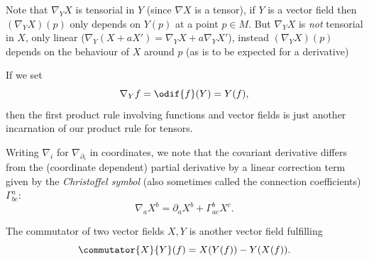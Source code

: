 \documentclass[titlepage,numbers=noenddot,headinclude,oneside,%
footinclude=true,cleardoublepage=empty,%
BCOR=5mm,paper=a4,fontsize=11pt,%
english,%
]{scrartcl}
\begin{document}
\begin{remark}
    Note that \( \nabla_Y X \) is tensorial in \( Y \) (since \( \nabla X \) is a tensor), \ie if \( Y  \) is a vector field then \( (\nabla_Y X)(p) \) only depends on \( Y(p) \) at a point \( p\in M \). But \( \nabla_Y X \) is \emph{not} tensorial in \( X \), only linear (\ie \( \nabla_Y (X+aX')=\nabla_Y X+ a\nabla_Y X' \)), instead \( (\nabla_Y X)(p) \) depends on the behaviour of \( X \) around \( p \) (as is to be expected for a derivative)
\end{remark}
\begin{remark}
    If we set
    \begin{equation*}
        \nabla_Y f =\odif{f}(Y)=Y(f),
    \end{equation*}
    then the first product rule involving functions and vector fields is just another incarnation of our product rule for tensors.
\end{remark}
\begin{remark}
    Writing \( \nabla_i \) for \( \nabla_{\partial_i} \) in coordinates, we note that the covariant derivative differs from the (coordinate dependent) partial derivative by a linear correction term given by the \emph{Christoffel symbol} (also sometimes called the connection coefficients) \( \Gamma^a_{b c} \):
    \begin{equation*}
        \nabla_{a} X^b = \partial_a X^b+\Gamma_{ac}^b X^c.
    \end{equation*}
\end{remark}
\begin{recall}
    The commutator of two vector fields \( X,Y \) is another vector field fulfilling
    \begin{equation*}
        \commutator{X}{Y}(f)=X(Y(f))-Y(X(f)).
    \end{equation*}
\end{recall}
\end{document}
